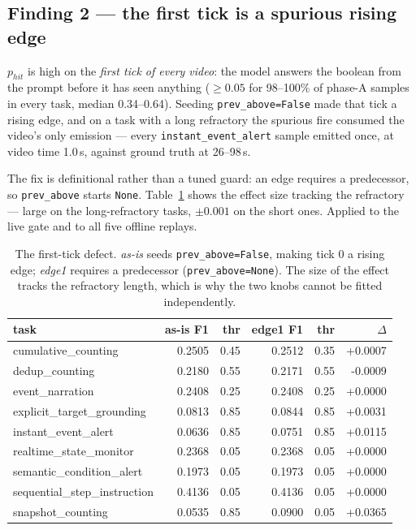 \documentclass[11pt,a4paper]{article}
\begin{document}
\subsection{Finding 2 --- the first tick is a spurious rising edge}\label{sec:f2}

$p_\mathit{hit}$ is high on the \emph{first tick of every video}: the
model answers the boolean from the prompt before it has seen anything
($\geq0.05$ for 98--100\% of phase-A samples in every task, median 0.34--0.64).
Seeding \texttt{prev\_above=False} made that tick a rising edge, and on a task
with a long refractory the spurious fire consumed the video's only emission ---
every \texttt{instant\_event\_alert} sample emitted once, at video time 1.0\,s,
against ground truth at 26--98\,s.

The fix is definitional rather than a tuned guard: an edge requires a
predecessor, so \texttt{prev\_above} starts \texttt{None}. Table~\ref{tab:firsttick}
shows the effect size tracking the refractory --- large on the long-refractory
tasks, $\pm0.001$ on the short ones. Applied to the live gate and to all five
offline replays.

\begin{table}[t]\centering\small\caption{The first-tick defect. \emph{as-is} seeds \texttt{prev\_above=False}, making tick 0 a rising edge; \emph{edge1} requires a predecessor (\texttt{prev\_above=None}). The size of the effect tracks the refractory length, which is why the two knobs cannot be fitted independently.}\label{tab:firsttick}
\begin{tabular}{lrrrrr}\toprule
task & as-is F1 & thr & edge1 F1 & thr & $\Delta$ \\\midrule
cumulative\_counting & 0.2505 & 0.45 & 0.2512 & 0.35 & +0.0007 \\
dedup\_counting & 0.2180 & 0.55 & 0.2171 & 0.55 & -0.0009 \\
event\_narration & 0.2408 & 0.25 & 0.2408 & 0.25 & +0.0000 \\
explicit\_target\_grounding & 0.0813 & 0.85 & 0.0844 & 0.85 & +0.0031 \\
instant\_event\_alert & 0.0636 & 0.85 & 0.0751 & 0.85 & +0.0115 \\
realtime\_state\_monitor & 0.2368 & 0.05 & 0.2368 & 0.05 & +0.0000 \\
semantic\_condition\_alert & 0.1973 & 0.05 & 0.1973 & 0.05 & +0.0000 \\
sequential\_step\_instruction & 0.4136 & 0.05 & 0.4136 & 0.05 & +0.0000 \\
snapshot\_counting & 0.0535 & 0.85 & 0.0900 & 0.05 & +0.0365 \\
\bottomrule\end{tabular}\end{table}
\end{document}
